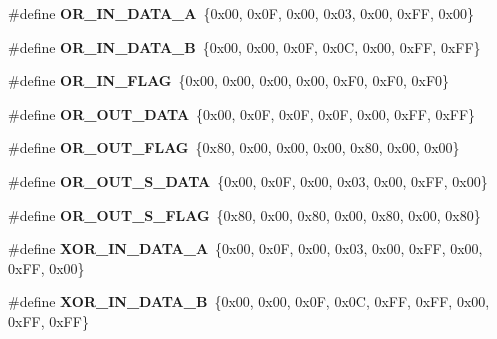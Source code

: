 \begin{DoxyCompactItemize}
\#define {\bfseries O\+R\+\_\+\+I\+N\+\_\+\+D\+A\+T\+A\+\_\+A}~\{0x00, 0x0\+F, 0x00, 0x03, 0x00, 0x\+F\+F, 0x00\}
\item 
\mbox{\label{unit-test-cpu-dispatch_8c_a14579b23c0ebf2af29e41fd8c4423821}} 
\#define {\bfseries O\+R\+\_\+\+I\+N\+\_\+\+D\+A\+T\+A\+\_\+B}~\{0x00, 0x00, 0x0\+F, 0x0\+C, 0x00, 0x\+F\+F, 0x\+F\+F\}
\item 
\mbox{\label{unit-test-cpu-dispatch_8c_add12e62946da3c76902c8aecc5bdf09e}} 
\#define {\bfseries O\+R\+\_\+\+I\+N\+\_\+\+F\+L\+AG}~\{0x00, 0x00, 0x00, 0x00, 0x\+F0, 0x\+F0, 0x\+F0\}
\item 
\mbox{\label{unit-test-cpu-dispatch_8c_a6880246013c39711d5d6305143dcc755}} 
\#define {\bfseries O\+R\+\_\+\+O\+U\+T\+\_\+\+D\+A\+TA}~\{0x00, 0x0\+F, 0x0\+F, 0x0\+F, 0x00, 0x\+F\+F, 0x\+F\+F\}
\item 
\mbox{\label{unit-test-cpu-dispatch_8c_ad141183d588fe9d3f2b2bdef402eac8a}} 
\#define {\bfseries O\+R\+\_\+\+O\+U\+T\+\_\+\+F\+L\+AG}~\{0x80, 0x00, 0x00, 0x00, 0x80, 0x00, 0x00\}
\item 
\mbox{\label{unit-test-cpu-dispatch_8c_aa90b9e72483a7450f20cef022496dbc8}} 
\#define {\bfseries O\+R\+\_\+\+O\+U\+T\+\_\+\+S\+\_\+\+D\+A\+TA}~\{0x00, 0x0\+F, 0x00, 0x03, 0x00, 0x\+F\+F, 0x00\}
\item 
\mbox{\label{unit-test-cpu-dispatch_8c_a44176d76efd0cb15bd9b9af0cb76e07c}} 
\#define {\bfseries O\+R\+\_\+\+O\+U\+T\+\_\+\+S\+\_\+\+F\+L\+AG}~\{0x80, 0x00, 0x80, 0x00, 0x80, 0x00, 0x80\}
\item 
\mbox{\label{unit-test-cpu-dispatch_8c_a5e33a679a3fec9625b23bcf70a9c353c}} 
\#define {\bfseries X\+O\+R\+\_\+\+I\+N\+\_\+\+D\+A\+T\+A\+\_\+A}~\{0x00, 0x0\+F, 0x00, 0x03, 0x00, 0x\+F\+F, 0x00, 0x\+F\+F, 0x00\}
\item 
\mbox{\label{unit-test-cpu-dispatch_8c_ab0dc92eac08b718b03b28da447165958}} 
\#define {\bfseries X\+O\+R\+\_\+\+I\+N\+\_\+\+D\+A\+T\+A\+\_\+B}~\{0x00, 0x00, 0x0\+F, 0x0\+C, 0x\+F\+F, 0x\+F\+F, 0x00, 0x\+F\+F, 0x\+F\+F\}

\end{DoxyCompactItemize}
